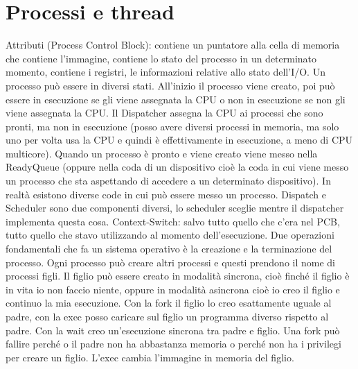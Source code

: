 \section{Processi e thread}
Attributi (Process Control Block): contiene un puntatore alla cella di memoria che contiene l’immagine, contiene lo stato del processo in un determinato momento, contiene i registri, le informazioni relative allo stato dell’I/O. 
Un processo può essere in diversi stati. 
All’inizio il processo viene creato, poi può essere in esecuzione se gli viene assegnata la CPU o non in esecuzione se non gli viene assegnata la CPU. Il Dispatcher assegna la CPU ai processi che sono pronti, ma non in esecuzione (posso 
avere diversi processi in memoria, ma solo uno per volta usa la CPU e quindi è effettivamente in esecuzione, a meno di CPU multicore). Quando un processo è pronto e viene creato viene messo nella ReadyQueue (oppure nella coda di un 
dispositivo cioè la coda in cui viene messo un processo che sta aspettando di accedere a un determinato dispositivo). In realtà esistono diverse code in cui può essere messo un processo. Dispatch e Scheduler sono due componenti diversi, 
lo scheduler sceglie mentre il dispatcher implementa questa cosa. Context-Switch: salvo tutto quello che c’era nel PCB, tutto quello che stavo utilizzando al momento dell’esecuzione. Due operazioni fondamentali che fa un sistema operativo
è la creazione e la terminazione del processo. Ogni processo può creare altri processi e questi prendono il nome di processi figli. Il figlio può essere creato in modalità sincrona, cioè finché il figlio è in vita io non faccio niente, 
oppure in modalità asincrona cioè io creo il figlio e continuo la mia esecuzione. Con la fork il figlio lo creo esattamente uguale al padre, con la exec posso caricare sul figlio un programma diverso rispetto al padre. Con la wait creo 
un’esecuzione sincrona tra padre e figlio. Una fork può fallire perché o il padre non ha abbastanza memoria o perché non ha i privilegi per creare un figlio. L’exec cambia l’immagine in memoria del figlio.
